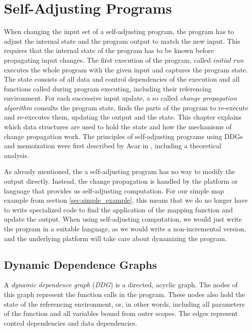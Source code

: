 
\chapter{Self-Adjusting Programs}
\label{ch:self_adjusting}

When changing the input set of a self-adjusting program, the program has to adjust the internal state and the program output to match the new input. This requires that the internal state of the program has to be known before propagating input changes. The first execution of the program, called \textit{initial run} executes the whole program with the given input and captures the program state. The state consists of all data and control dependencies of the execution and all functions called during program executing, including their referencing environment. 
For each successive input update, a so called \textit{change propagation algorithm} consults the program state, finds the parts of the program to re-execute and re-executes them, updating the output and the state.  
This chapter explains which data structures are used to hold the state and how the mechanisms of change propagation work. The principles of self-adjusting programs using DDGs and memoization were first described by Acar in \cite{Acar2005thesis}, including a theoretical analysis. 

As already mentioned, the a self-adjusting program has no way to modify the output directly. Instead, the change propagation is handled by the platform or language that provides us self-adjusting computation. For our simple map example from section \ref{sec:simple_example}, this means that we do no longer have to write specialized code to find the application of the mapping function and update the output. When using self-adjusting computation, we would just write the program in a suitable language, as we would write a non-incremental version, and the underlying platform will take care about dynamizing the program.

\section{Dynamic Dependence Graphs}
\label{sec:ddg}

A \textit{dynamic dependence graph} (\textit{DDG}) is a directed, acyclic graph. The nodes of this graph represent the function calls in the program. These nodes also hold the state of the referencing environment, or, in other words, including all parameters of the function and all variables bound from outer scopes. The edges represent control dependencies and data dependencies. 

